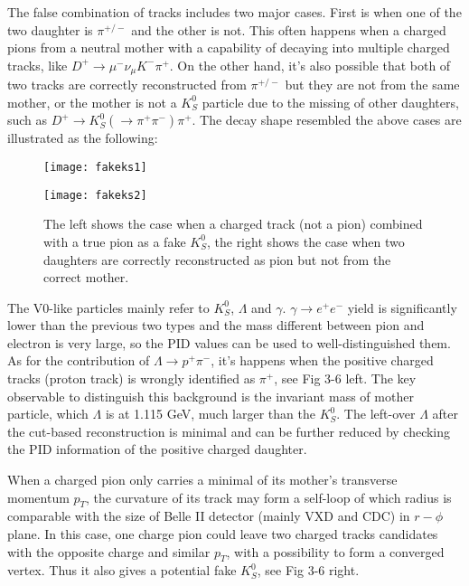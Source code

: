 The false combination of tracks includes two major cases. First is when one of the two daughter is $\pi^{+/-}$ and the other is not. This often happens when a charged pions from a neutral mother with a capability of decaying into multiple charged tracks, like $D^+ \to \mu^- \nu_{\mu} K^- \pi^+$. On the other hand, it's also possible that both of two tracks are correctly reconstructed from $\pi^{+/-}$ but they are not from the same mother, or the mother is not a $K_S^0$ particle due to the missing of other daughters, such as $D^+ \to K_S^0 (  \to \pi^+ \pi^-) \pi^+$. The decay shape resembled the above cases are illustrated as the following:  


\begin{figure}[htpb]
	\begin{minipage}[t]{0.5\linewidth} %
		\centering 
		\texttt{[image: fakeks1]} 
		\label{fig:side:a} 
	\end{minipage}%
	\begin{minipage}[t]{0.5\linewidth} 
		\centering 
		\texttt{[image: fakeks2]} 
		\label{fig:side:b} 
	\end{minipage}%
	
	\caption{The left shows the case when a charged track (not a pion) combined with a true pion as a fake $K_S^0$, the right shows the case when two daughters are correctly reconstructed as pion but not from the correct mother. }
\end{figure}

The V0-like particles mainly refer to $K_S^0$, $\Lambda$ and $\gamma$. $\gamma \to e^+ e^-$ yield is significantly lower than the previous two types and the mass different between pion and electron is very large, so the PID values can be used to well-distinguished them. As for the contribution of $\Lambda \to p^+ \pi^-$, it's happens when the positive charged tracks (proton track) is wrongly identified as $\pi^+$, see Fig 3-6 left. The key observable to distinguish this background is the invariant mass of mother particle, which $\Lambda$ is at 1.115 GeV, much larger than the $K_S^0$. The left-over $\Lambda$ after the cut-based reconstruction is minimal and can be further reduced by checking the PID information of the positive charged daughter. 

When a charged pion only carries a minimal of its mother's transverse momentum $p_T$, the curvature of its track may form a self-loop of which radius is comparable with the size of Belle II detector (mainly VXD and CDC) in $r-\phi$ plane. In this case, one charge pion could leave two charged tracks candidates with the opposite charge and similar $p_T$, with a possibility to form a converged vertex. Thus it also gives a potential fake $K_S^0$, see Fig 3-6 right.

